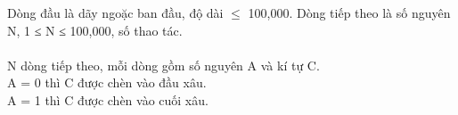 Dòng đầu là dãy ngoặc ban đầu, độ dài  $\le$  100,000. Dòng tiếp theo là số nguyên N, 1 ≤ N ≤ 100,000, số thao tác.
\\
\\N dòng tiếp theo, mỗi dòng gồm số nguyên A và kí tự C.
\\A = 0 thì C được chèn vào đầu xâu.
\\A = 1 thì C được chèn vào cuối xâu.

\